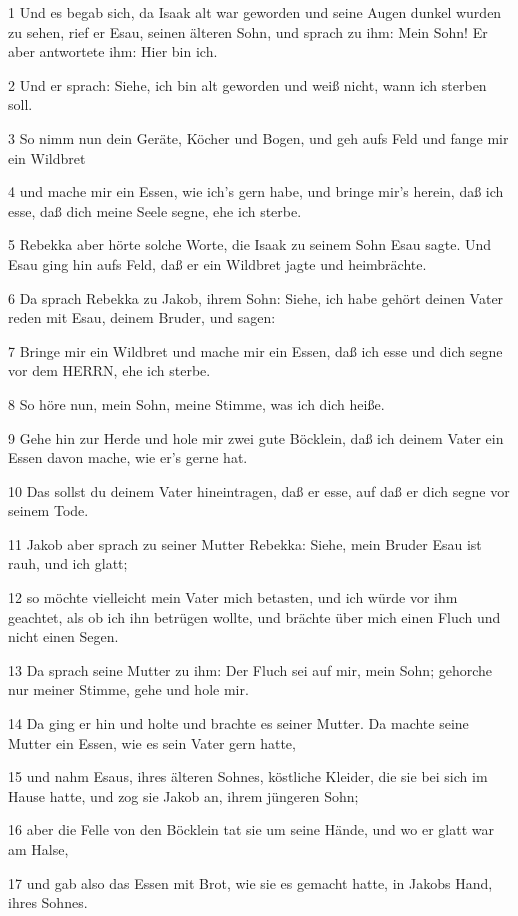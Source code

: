 \par 1 Und es begab sich, da Isaak alt war geworden und seine Augen dunkel wurden zu sehen, rief er Esau, seinen älteren Sohn, und sprach zu ihm: Mein Sohn! Er aber antwortete ihm: Hier bin ich.
\par 2 Und er sprach: Siehe, ich bin alt geworden und weiß nicht, wann ich sterben soll.
\par 3 So nimm nun dein Geräte, Köcher und Bogen, und geh aufs Feld und fange mir ein Wildbret
\par 4 und mache mir ein Essen, wie ich's gern habe, und bringe mir's herein, daß ich esse, daß dich meine Seele segne, ehe ich sterbe.
\par 5 Rebekka aber hörte solche Worte, die Isaak zu seinem Sohn Esau sagte. Und Esau ging hin aufs Feld, daß er ein Wildbret jagte und heimbrächte.
\par 6 Da sprach Rebekka zu Jakob, ihrem Sohn: Siehe, ich habe gehört deinen Vater reden mit Esau, deinem Bruder, und sagen:
\par 7 Bringe mir ein Wildbret und mache mir ein Essen, daß ich esse und dich segne vor dem HERRN, ehe ich sterbe.
\par 8 So höre nun, mein Sohn, meine Stimme, was ich dich heiße.
\par 9 Gehe hin zur Herde und hole mir zwei gute Böcklein, daß ich deinem Vater ein Essen davon mache, wie er's gerne hat.
\par 10 Das sollst du deinem Vater hineintragen, daß er esse, auf daß er dich segne vor seinem Tode.
\par 11 Jakob aber sprach zu seiner Mutter Rebekka: Siehe, mein Bruder Esau ist rauh, und ich glatt;
\par 12 so möchte vielleicht mein Vater mich betasten, und ich würde vor ihm geachtet, als ob ich ihn betrügen wollte, und brächte über mich einen Fluch und nicht einen Segen.
\par 13 Da sprach seine Mutter zu ihm: Der Fluch sei auf mir, mein Sohn; gehorche nur meiner Stimme, gehe und hole mir.
\par 14 Da ging er hin und holte und brachte es seiner Mutter. Da machte seine Mutter ein Essen, wie es sein Vater gern hatte,
\par 15 und nahm Esaus, ihres älteren Sohnes, köstliche Kleider, die sie bei sich im Hause hatte, und zog sie Jakob an, ihrem jüngeren Sohn;
\par 16 aber die Felle von den Böcklein tat sie um seine Hände, und wo er glatt war am Halse,
\par 17 und gab also das Essen mit Brot, wie sie es gemacht hatte, in Jakobs Hand, ihres Sohnes.
